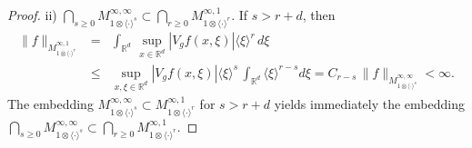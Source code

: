 \documentclass[12pt]{amsart}
\theoremstyle{definition}
\theoremstyle{remark}
\numberwithin{equation}{section}
\def\bR{{\mathbb{R}}}
\def\rd{\bR^d}
\newcommand{\lan}{\langle}
\newcommand{\ran}{\rangle}
\begin{document}
\begin{proof}
ii) %
$
\bigcap_{s\ge0}M^{\infty,\infty}_{1\otimes\lan\cdot\ran^s}\subset
\bigcap_{r\ge0}M^{\infty,1}_{1\otimes\lan\cdot\ran^r}$. If
$s>r+d$,  then
\begin{eqnarray*}
\|f\|_{M^{\infty,1}_{1\otimes\lan\cdot\ran^r}}
&=&\int_{\rd}\,\sup_{x\in\rd}|V_gf(x,\xi)|{\lan\xi\ran^r}\,d\xi
\\ & \le & \sup _{x,\xi \in \rd } |V_g f (x,\xi ) | \langle \xi
\rangle ^s \,  \int_{\rd}\lan \xi\ran^{r-s}d\xi = C_{r-s} \,
\|f\|_{M^{\infty,\infty}_{1\otimes\lan\cdot\ran^s}} <\infty.
\end{eqnarray*}
The  embedding $M^{\infty,\infty}_{1\otimes\lan\cdot\ran^s}
\subset M^{\infty,1}_{1\otimes\lan\cdot\ran^r}$ for $s>r+d$ yields
  immediately the embedding   $
  \bigcap_{s\ge0}M^{\infty,\infty}_{1\otimes\lan\cdot\ran^s}\subset 
\bigcap_{r\ge0}M^{\infty,1}_{1\otimes\lan\cdot\ran^r}$.%


\end{proof}
\end{document}
